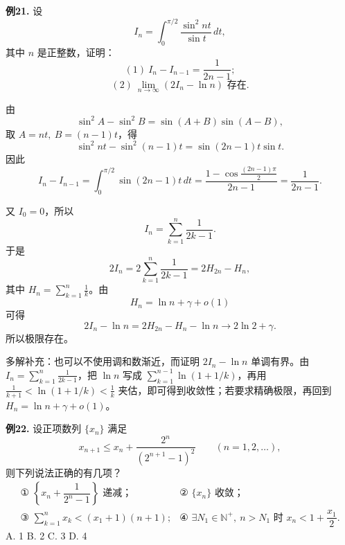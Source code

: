 \begin{problemblock}
\textbf{例21.} 设
\[
I_n=\int_0^{\pi/2}\frac{\sin^2 nt}{\sin t}\,dt,
\]
其中 \(n\) 是正整数，证明：
\[
(1)\ I_n-I_{n-1}=\frac1{2n-1};
\]
\[
(2)\ \lim_{n\to\infty}(2I_n-\ln n)\text{ 存在}.
\]
\end{problemblock}

\begin{solutionblock}

由
\[
\sin^2A-\sin^2B=\sin(A+B)\sin(A-B),
\]
取 \(A=nt,\ B=(n-1)t\)，得
\[
\sin^2nt-\sin^2(n-1)t=\sin(2n-1)t\sin t.
\]
因此
\[
I_n-I_{n-1}
=\int_0^{\pi/2}\sin(2n-1)t\,dt
=\frac{1-\cos\frac{(2n-1)\pi}{2}}{2n-1}
=\frac1{2n-1}.
\]

又 \(I_0=0\)，所以
\[
I_n=\sum_{k=1}^n\frac1{2k-1}.
\]
于是
\[
2I_n=2\sum_{k=1}^n\frac1{2k-1}
=2H_{2n}-H_n,
\]
其中 \(H_n=\sum_{k=1}^n\frac1k\)。由
\[
H_n=\ln n+\gamma+o(1)
\]
可得
\[
2I_n-\ln n
=2H_{2n}-H_n-\ln n
\to 2\ln2+\gamma.
\]
所以极限存在。

多解补充：也可以不使用调和数渐近，而证明 \(2I_n-\ln n\) 单调有界。由 \(I_n=\sum_{k=1}^n\frac1{2k-1}\)，把 \(\ln n\) 写成 \(\sum_{k=1}^{n-1}\ln(1+1/k)\)，再用 \(\frac1{k+1}<\ln(1+1/k)<\frac1k\) 夹估，即可得到收敛性；若要求精确极限，再回到 \(H_n=\ln n+\gamma+o(1)\)。
\end{solutionblock}

\begin{problemblock}
\textbf{例22.} 设正项数列 \(\{x_n\}\) 满足
\[
x_{n+1}\le x_n+\frac{2^n}{(2^{n+1}-1)^2}\qquad(n=1,2,\dots),
\]
则下列说法正确的有几项？
\[
\begin{array}{ll}
\text{① }\left\{x_n+\dfrac1{2^n-1}\right\}\text{ 递减；}&
\text{② }\{x_n\}\text{ 收敛；}\\[2mm]
\text{③ }\displaystyle\sum_{k=1}^n x_k<(x_1+1)(n+1);&
\text{④ }\exists N_1\in\mathbb N^+,\ n>N_1\text{ 时 }x_n<1+\dfrac{x_1}{2}.
\end{array}
\]
A. 1 \qquad B. 2 \qquad C. 3 \qquad D. 4
\end{problemblock}

